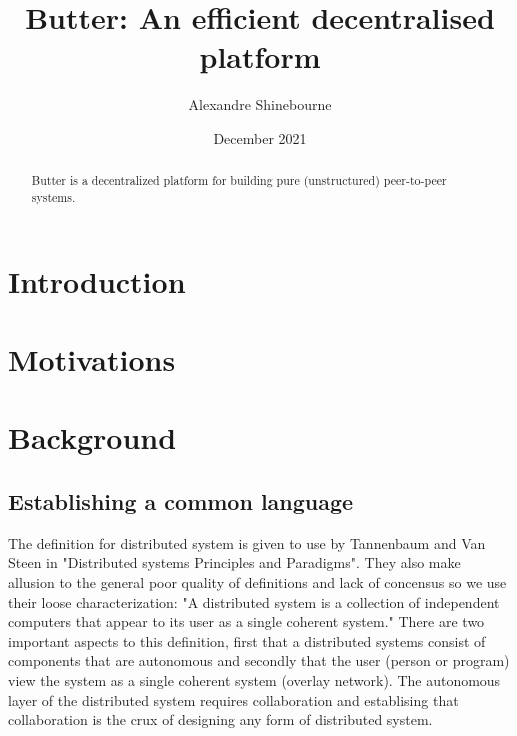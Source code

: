\documentclass[a4paper]{article}
\title{Butter: An efficient decentralised platform}
\author{Alexandre Shinebourne}
\date{December 2021}
\begin{document}
\maketitle


\begin{abstract}
    Butter is a decentralized platform for building pure (unstructured) peer-to-peer systems.
\end{abstract}


\tableofcontents

\section{Introduction}

\section{Motivations}

\section{Background}
\subsection{Establishing a common language}\label{subsec:establishing-a-common-language}
The definition for distributed system is given to use by Tannenbaum and Van Steen in "Distributed systems Principles and Paradigms". They also make allusion to the general poor quality of definitions and lack of concensus so we use their loose characterization: "A distributed system is a collection of independent computers that appear to its user as a single coherent system."
There are two important aspects to this definition, first that a distributed systems consist of components that are autonomous and secondly that the user (person or program) view the system as a single coherent system (overlay network). The autonomous layer of the distributed system requires collaboration and establising that collaboration is the crux of designing any form of distributed system.
\end{document}
